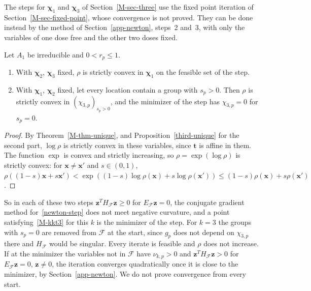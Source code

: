 The steps for $\bm\chi_1$ and $\bm\chi_3$ of Section~\ref{M-sec-three} use the
fixed point iteration of Section~\ref{M-sec-fixed-point}, whose convergence is
not proved. They can be done instead by the method of Section~\ref{app-newton},
steps~2 and~3, with only the variables of one dose free and the other two doses
fixed.

\begin{proposition}\label{block-newton}
Let $A_1$ be irreducible and $0<r_p\le 1$.
\begin{enumerate}
\item With $\bm\chi_2$, $\bm\chi_3$ fixed, $\rho$ is strictly convex in
$\bm\chi_1$ on the feasible set of the step.
\item With $\bm\chi_1$, $\bm\chi_2$ fixed, let every location contain a group
with $s_p>0$. Then $\rho$ is strictly convex in $(\chi_{3,p})_{s_p>0}$, and the
minimizer of the step has $\chi_{3,p}=0$ for $s_p=0$.
\end{enumerate}
\end{proposition}
\begin{proof}
By Theorem~\ref{M-thm-unique}, and Proposition~\ref{third-unique} for the
second part, $\log\rho$ is strictly convex in these variables, since $\bm t$ is
affine in them. The function $\exp$ is convex and strictly increasing, so
$\rho=\exp(\log\rho)$ is strictly convex: for $\bm x\ne\bm x'$ and
$s\in(0,1)$, $\rho\left((1-s)\bm x+s\bm x'\right)<\exp\left((1-s)\log\rho(\bm x)+s\log\rho(\bm x')\right)\le(1-s)\rho(\bm x)+s\rho(\bm x')$.
\end{proof}

So in each of these two steps $\bm z^TH_{\mathcal F}\bm z\ge 0$ for
$E_{\mathcal F}\bm z=0$, the conjugate gradient method for~\eqref{newton-step}
does not meet negative curvature, and a point satisfying~\eqref{M-kkt3} for this
$k$ is the minimizer of the step. For $k=3$ the groups with $s_p=0$ are
removed from $\mathcal F$ at the start, since $g_p$ does not depend on
$\chi_{3,p}$ there and $H_{\mathcal F}$ would be singular. Every iterate is
feasible and $\rho$ does not increase. If at the minimizer the variables not in
$\mathcal F$ have $\nu_{k,p}>0$ and $\bm z^TH_{\mathcal F}\bm z>0$ for
$E_{\mathcal F}\bm z=0$, $\bm z\ne 0$, the iteration converges quadratically
once it is close to the minimizer, by Section~\ref{app-newton}. We do not prove
convergence from every start.
